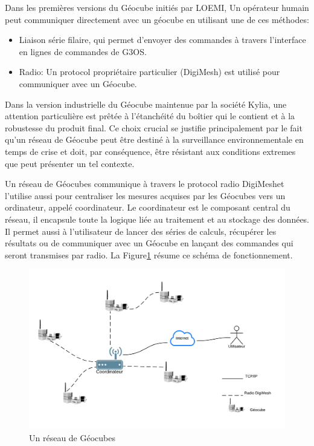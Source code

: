 \documentclass{themeensg}
\begin{document}
Dans les premières versions du Géocube initiés par LOEMI, Un opérateur humain peut communiquer directement avec un géocube en utilisant une de ces méthodes:

\begin{itemize}
\item Liaison série filaire, qui permet d'envoyer des commandes  à travers l'interface en lignes de commandes de G3OS.
\item Radio: Un protocol propriétaire particulier (DigiMesh\textcopyright) est utilisé pour communiquer avec un Géocube.
\end{itemize}

Dans la version industrielle du Géocube maintenue par la société Kylia, une attention particulière est prêtée à l'étanchéité du boîtier qui le contient et à la robustesse du produit final. Ce choix crucial se justifie principalement par le fait qu'un réseau de Géocube peut être destiné à la surveillance environnementale en temps de crise et doit, par conséquence, être résistant aux conditions extremes que peut présenter un tel contexte.

Un réseau de Géocubes communique à travers le protocol radio DigiMesh\textcopyright et l'utilise aussi pour centraliser les mesures acquises par les Géocubes vers un ordinateur, appelé coordinateur. Le coordinateur est le composant central du réseau, il encapsule toute la logique liée au traitement et au stockage des données. Il permet aussi à l'utilisateur de lancer des séries de calculs, récupérer les résultats ou de communiquer avec un Géocube en lançant des commandes qui seront transmises par radio. La Figure\ref{fig:geocube_network} résume ce schéma de fonctionnement.

\begin{figure}[h!]
\centering
\includegraphics[scale=0.8]{images/fig1.png}
\caption{Un réseau de Géocubes}
\label{fig:geocube_network}
\end{figure}
\end{document}
